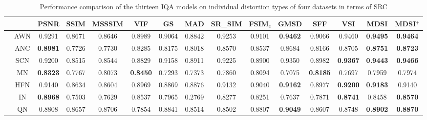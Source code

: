 \begin{table*}[htb]
\caption{Performance comparison of the thirteen IQA models on individual distortion types of four datasets in terms of SRC}
\scriptsize
\centering
\begin{tabular}{ccccccccccccccc}
\hline
                      &       & PSNR            & SSIM            & MSSSIM          & VIF             & GS              & MAD             & SR\_SIM         & FSIM$_c$           & GMSD            & SFF             & VSI             & MDSI             & MDSI$^+$                                \\ \hline
                      & AWN   & 0.9291          & 0.8671          & 0.8646          & 0.8989          & 0.9064          & 0.8842          & 0.9253          & 0.9101          & \textbf{0.9462} & 0.9066          & 0.9460 & \textbf{0.9495} & \textbf{0.9464}                     \\
                      & ANC   & \textbf{0.8981} & 0.7726          & 0.7730          & 0.8285          & 0.8175          & 0.8018          & 0.8570          & 0.8537          & 0.8684          & 0.8166          & 0.8705 & \textbf{0.8751} & \textbf{0.8723}                     \\
                      & SCN   & 0.9200          & 0.8515          & 0.8544          & 0.8829          & 0.9158          & 0.8911          & 0.9225          & 0.8900          & 0.9350 & 0.8982          & \textbf{0.9367} & \textbf{0.9443} & \textbf{0.9466}                     \\
                      & MN    & \textbf{0.8323} & 0.7767          & 0.8073          & \textbf{0.8450} & 0.7293          & 0.7373          & 0.7860          & 0.8094          & 0.7075          & \textbf{0.8185} & 0.7697          & 0.7959 & 0.7974                              \\
                      & HFN   & 0.9140          & 0.8634          & 0.8604          & 0.8969          & 0.8869          & 0.8876          & 0.9132          & 0.9040          & \textbf{0.9162} & 0.8977          & \textbf{0.9200} & \textbf{0.9183} & 0.9140                     \\
                      & IN    & \textbf{0.8968} & 0.7503          & 0.7629          & 0.8537 & 0.7965          & 0.2769          & 0.8277          & 0.8251          & 0.7637          & 0.7871          & \textbf{0.8741} & 0.8458 & \textbf{0.8570}                              \\
                      & QN    & 0.8808 & 0.8657          & 0.8706          & 0.7854          & 0.8841          & 0.8514          & 0.8502          & 0.8807          & \textbf{0.9049} & 0.8607          & 0.8748          & \textbf{0.8902} & \textbf{0.8870}                     \\

\end{tabular}
\end{table*}
